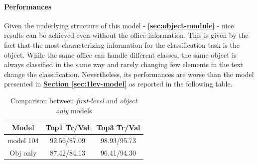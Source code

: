 \documentclass[12pt]{article}
\begin{document}
\paragraph{Performances}
Given the underlying structure of this model - \textbf{\ref{sec:object-module}} - nice results can be achieved even without the office information. This is given by the fact that the most characterizing information for the classification task is the object. While the same office can handle different classes, the same object is always classified in the same way and rarely changing few elements in the text change the classification.  Nevertheless, its performances are worse than the model presented in \hyperref[sec:1lev-model]{\textbf{Section \ref{sec:1lev-model}}} as reported in the following table.
\begin{table}[ht!]
    \begin{adjustwidth}{}{}
	    \centering
	    \small
	    \begin{tabular}{ |c|c|c| }
        \hline
        \textbf{Model} & \textbf{Top1 Tr/Val} & \textbf{Top3 Tr/Val}\\
        \hline
        model 104 & 92.56/87.09 & 98.93/95.73 \\
        Obj only & 87.42/84.13 & 96.41/94.30 \\
        \hline
        \end{tabular}
	    \label{tb:relevant-obj}
    \end{adjustwidth}
    \captionsetup{justification   = centering}
    \caption{Comparison between \textit{first-level} and \textit{object only} models}
\end{table}
\end{document}
